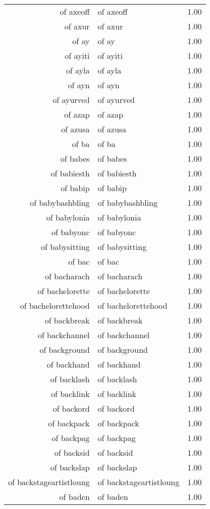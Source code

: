 \begin{table}[ht]
\begin{tabular}{rlr}
  of axeoff & of axeoff & 1.00 \\ 
  of axur & of axur & 1.00 \\ 
  of ay & of ay & 1.00 \\ 
  of ayiti & of ayiti & 1.00 \\ 
  of ayla & of ayla & 1.00 \\ 
  of ayn & of ayn & 1.00 \\ 
  of ayurved & of ayurved & 1.00 \\ 
  of azap & of azap & 1.00 \\ 
  of azusa & of azusa & 1.00 \\ 
  of ba & of ba & 1.00 \\ 
  of babes & of babes & 1.00 \\ 
  of babiesth & of babiesth & 1.00 \\ 
  of babip & of babip & 1.00 \\ 
  of babybashbling & of babybashbling & 1.00 \\ 
  of babylonia & of babylonia & 1.00 \\ 
  of babyonc & of babyonc & 1.00 \\ 
  of babysitting & of babysitting & 1.00 \\ 
  of bac & of bac & 1.00 \\ 
  of bacharach & of bacharach & 1.00 \\ 
  of bachelorette & of bachelorette & 1.00 \\ 
  of bachelorettehood & of bachelorettehood & 1.00 \\ 
  of backbreak & of backbreak & 1.00 \\ 
  of backchannel & of backchannel & 1.00 \\ 
  of background & of background & 1.00 \\ 
  of backhand & of backhand & 1.00 \\ 
  of backlash & of backlash & 1.00 \\ 
  of backlink & of backlink & 1.00 \\ 
  of backord & of backord & 1.00 \\ 
  of backpack & of backpack & 1.00 \\ 
  of backpag & of backpag & 1.00 \\ 
  of backsid & of backsid & 1.00 \\ 
  of backslap & of backslap & 1.00 \\ 
  of backstageartistloung & of backstageartistloung & 1.00 \\ 
  of baden & of baden & 1.00 \\ 

\end{tabular}
\end{table}

